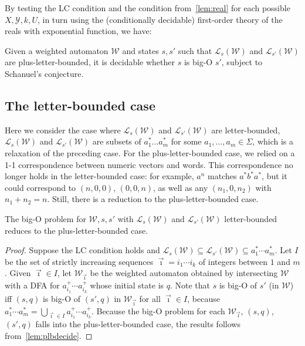\documentclass[10pt,a4paper]{amsart}
\numberwithin{equation}{section}
\theoremstyle{plain}
\theoremstyle{definition}
\theoremstyle{remark}
\newcommand\lng[2]{\mathcal{L}_{#1}(#2)}
\newcommand\wa{\mathcal{W}}
\begin{document}
By testing the LC condition and the condition from~\cref{lem:real}  for each possible $X,\mathcal{Y}, k,U$, in turn using the (conditionally decidable) first-order theory of the reals with exponential function, we have:
\begin{lem}\label{lem:plbdecide}
Given a weighted automaton $\wa$ and states $s,s'$ such that $\lng{s}{\wa}$ and $\lng{s'}{\wa}$ are  plus-letter-bounded, it is decidable whether $s$ is big-O $s'$, subject to Schanuel's conjecture.
\end{lem}

\subsection{The letter-bounded case}\label{sec:letterboundedcase}

Here we consider the case where $\lng{s}{\wa}$ and $\lng{s'}{\wa}$ are letter-bounded,
$\lng{s}{\wa}$ and $\lng{s'}{\wa}$ are subsets of $a_1^*\dots a_m^*$ for some $a_1,\dots,a_m\in\Sigma$,
which is a relaxation of the preceding case.
For the plus-letter-bounded case, we relied on a 1-1 correspondence between numeric vectors and words.
This correspondence no longer holds in the letter-bounded case: for example, $a^n$ matches  $a^* b^* a^*$, but it could correspond to $(n,0,0)$, $(0,0,n)$, as well as any $(n_1,0,n_2)$ with $n_1+n_2=n$.
Still, there is a reduction to the plus-letter-bounded case.

\begin{lem}\label{lem:lbtoplb}
The big-O problem for $\wa, s, s'$ with $\lng{s}{\wa}$ and $\lng{s'}{\wa}$ letter-bounded reduces to the plus-letter-bounded case.
\end{lem}

\begin{proof}
Suppose the LC condition holds and  $\lng{s}{\wa}\subseteq \lng{s'}{\wa} \subseteq a_1^\ast\cdots a_m^\ast$.
Let $I$ be the set of strictly increasing sequences $\vec{\imath} = i_1\cdots i_k$ of integers between $1$ and $m$.
Given $ \vec{\imath}\in I$, let $\wa_{\vec{\imath}}$ be the weighted automaton obtained by intersecting $\wa$ with a DFA for $a_{i_1}^+\cdots a_{i_k}^+$ whose initial state is $q$.
Note that $s$ is big-O of $s'$ (in $\wa$) iff $(s,q)$ is big-O of $(s',q)$ in $\wa_{\vec{\imath}}$ for all $\vec{\imath}\in I$, because $a_1^\ast\cdots a_m^\ast = \bigcup_{\vec{\imath}\in I} a_{i_1}^+\cdots a_{i_k}^+$.
Because the big-O problem for each $\wa_{\vec{\imath}}$, $(s,q)$, $(s',q)$ falls into the plus-letter-bounded case, the results follows from~\cref{lem:plbdecide}.
\end{proof}
\end{document}
